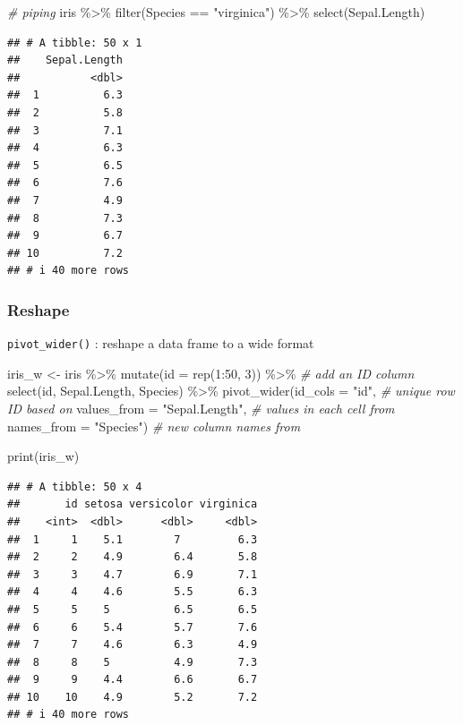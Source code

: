 \documentclass[
]{article}
\newenvironment{Shaded}{\begin{snugshade}}{\end{snugshade}}
\newcommand{\AttributeTok}[1]{\textcolor[rgb]{0.77,0.63,0.00}{#1}}
\newcommand{\CommentTok}[1]{\textcolor[rgb]{0.56,0.35,0.01}{\textit{#1}}}
\newcommand{\DecValTok}[1]{\textcolor[rgb]{0.00,0.00,0.81}{#1}}
\newcommand{\FunctionTok}[1]{\textcolor[rgb]{0.00,0.00,0.00}{#1}}
\newcommand{\NormalTok}[1]{#1}
\newcommand{\OtherTok}[1]{\textcolor[rgb]{0.56,0.35,0.01}{#1}}
\newcommand{\SpecialCharTok}[1]{\textcolor[rgb]{0.00,0.00,0.00}{#1}}
\newcommand{\StringTok}[1]{\textcolor[rgb]{0.31,0.60,0.02}{#1}}
\begin{document}
\begin{Shaded}
\begin{Highlighting}[]
\CommentTok{\# piping}
\NormalTok{iris }\SpecialCharTok{\%\textgreater{}\%} 
  \FunctionTok{filter}\NormalTok{(Species }\SpecialCharTok{==} \StringTok{"virginica"}\NormalTok{) }\SpecialCharTok{\%\textgreater{}\%} 
  \FunctionTok{select}\NormalTok{(Sepal.Length)}
\end{Highlighting}
\end{Shaded}

\begin{verbatim}
## # A tibble: 50 x 1
##    Sepal.Length
##           <dbl>
##  1          6.3
##  2          5.8
##  3          7.1
##  4          6.3
##  5          6.5
##  6          7.6
##  7          4.9
##  8          7.3
##  9          6.7
## 10          7.2
## # i 40 more rows
\end{verbatim}

\hypertarget{reshape}{%
\subsubsection{Reshape}\label{reshape}}

\texttt{pivot\_wider()} : reshape a data frame to a wide format

\begin{Shaded}
\begin{Highlighting}[]
\NormalTok{iris\_w }\OtherTok{\textless{}{-}}\NormalTok{ iris }\SpecialCharTok{\%\textgreater{}\%} 
  \FunctionTok{mutate}\NormalTok{(}\AttributeTok{id =} \FunctionTok{rep}\NormalTok{(}\DecValTok{1}\SpecialCharTok{:}\DecValTok{50}\NormalTok{, }\DecValTok{3}\NormalTok{)) }\SpecialCharTok{\%\textgreater{}\%} \CommentTok{\# add an ID column}
  \FunctionTok{select}\NormalTok{(id, Sepal.Length, Species) }\SpecialCharTok{\%\textgreater{}\%} 
  \FunctionTok{pivot\_wider}\NormalTok{(}\AttributeTok{id\_cols =} \StringTok{"id"}\NormalTok{, }\CommentTok{\# unique row ID based on}
              \AttributeTok{values\_from =} \StringTok{"Sepal.Length"}\NormalTok{, }\CommentTok{\# values in each cell from}
              \AttributeTok{names\_from =} \StringTok{"Species"}\NormalTok{) }\CommentTok{\# new column names from}

\FunctionTok{print}\NormalTok{(iris\_w)}
\end{Highlighting}
\end{Shaded}

\begin{verbatim}
## # A tibble: 50 x 4
##       id setosa versicolor virginica
##    <int>  <dbl>      <dbl>     <dbl>
##  1     1    5.1        7         6.3
##  2     2    4.9        6.4       5.8
##  3     3    4.7        6.9       7.1
##  4     4    4.6        5.5       6.3
##  5     5    5          6.5       6.5
##  6     6    5.4        5.7       7.6
##  7     7    4.6        6.3       4.9
##  8     8    5          4.9       7.3
##  9     9    4.4        6.6       6.7
## 10    10    4.9        5.2       7.2
## # i 40 more rows
\end{verbatim}
\end{document}
